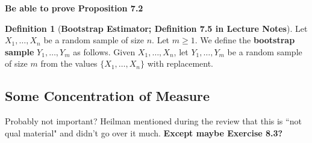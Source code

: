 \documentclass{article}
\theoremstyle{definition}
\theoremstyle{definition}
\theoremstyle{definition}
\theoremstyle{definition}
\theoremstyle{definition}
\newtheorem{definition}{Definition}[section]
\theoremstyle{definition}
\theoremstyle{definition}
\begin{document}
\textbf{Be able to prove Proposition 7.2}

\begin{definition}[\textbf{Bootstrap Estimator; Definition 7.5 in Lecture Notes}]Let \(X_1, \ldots, X_n\) be a random sample of size \(n\). Let \(m \geq 1\). We define the \textbf{bootstrap sample} \(Y_1, \ldots, Y_m\) as follows. Given \(X_1, \ldots, X_n\), let \(Y_1, \ldots, Y_m\) be a random sample of size \(m\) from the values \(\{X_1, \ldots, X_n\}\) with replacement.

\end{definition}

\subsection{Some Concentration of Measure}

Probably not important? Heilman mentioned during the review that this is ``not qual material" and didn't go over it much. \textbf{Except maybe Exercise 8.3?}
\end{document}
